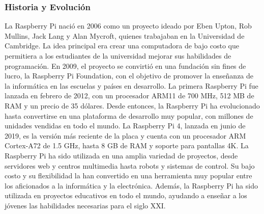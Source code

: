 \subsubsection{Historia y Evoluci\'on}
    \label{subsubsection:historiaEvolucion}
    La Raspberry Pi naci\'o en 2006 como un proyecto ideado por Eben Upton, Rob Mullins, Jack Lang y Alan Mycroft, 
        quienes trabajaban en la Universidad de Cambridge. La idea principal era crear una computadora de bajo costo 
        que permitiera a los estudiantes de la universidad mejorar sus habilidades de programaci\'on. \cite{Santamaria2023}
        En 2009, el proyecto se convirti\'o en una fundaci\'on sin fines de lucro, la Raspberry Pi Foundation, 
        con el objetivo de promover la ense\~nanza de la inform\'atica en las escuelas y pa\'ises en desarrollo. \cite{Santamaria2023}
    \vskip 0.5cm
    La primera Raspberry Pi fue lanzada en febrero de 2012, con un procesador ARM11 de 700 MHz, 512 MB de RAM y 
        un precio de 35 d\'olares. Desde entonces, la Raspberry Pi ha evolucionado hasta convertirse en una 
        plataforma de desarrollo muy popular, con millones de unidades vendidas en todo el mundo.\cite{Santamaria2023}
        La Raspberry Pi 4, lanzada en junio de 2019, es la versi\'on m\'as reciente de la placa y cuenta con un 
        procesador ARM Cortex-A72 de 1.5 GHz, hasta 8 GB de RAM y soporte para pantallas 4K. \cite{Santamaria2023}
    \vskip 0.5cm
    La Raspberry Pi ha sido utilizada en una amplia variedad de proyectos, desde servidores web y centros multimedia 
        hasta robots y sistemas de control. Su bajo costo y su flexibilidad la han convertido en una herramienta 
        muy popular entre los aficionados a la inform\'atica y la electr\'onica. Adem\'as, la Raspberry Pi ha sido 
        utilizada en proyectos educativos en todo el mundo, ayudando a ense\~nar a los j\'ovenes las habilidades 
        necesarias para el siglo XXI.
